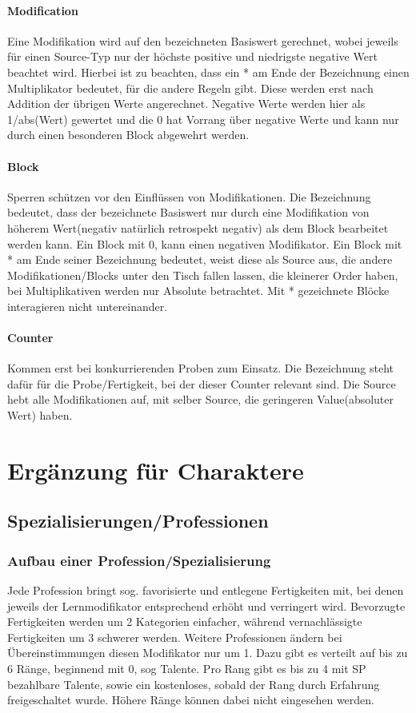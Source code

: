 \documentclass[a4paper,12pt,oneside]{book}
\begin{document}
\subsection{Modification}
Eine Modifikation wird auf den bezeichneten Basiswert gerechnet, wobei jeweils für einen Source-Typ nur der höchste positive und niedrigste negative Wert beachtet wird. Hierbei ist zu beachten, dass ein * am Ende der Bezeichnung einen Multiplikator bedeutet, für die andere Regeln gibt. Diese werden erst nach Addition der übrigen Werte angerechnet. Negative Werte werden hier als 1/abs(Wert) gewertet und die 0 hat Vorrang über negative Werte und kann nur durch einen besonderen Block abgewehrt werden.
\subsection{Block}
Sperren schützen vor den Einflüssen von Modifikationen. Die Bezeichnung bedeutet, dass der bezeichnete Basiswert nur durch eine Modifikation von höherem Wert(negativ natürlich retrospekt negativ) als dem Block bearbeitet werden kann. Ein Block mit 0, kann einen negativen Modifikator. Ein Block mit * am Ende seiner Bezeichnung bedeutet, weist diese als Source aus, die andere Modifikationen/Blocks unter den Tisch fallen lassen, die kleinerer Order haben, bei Multiplikativen werden nur Absolute betrachtet. Mit * gezeichnete Blöcke interagieren nicht untereinander.
\subsection{Counter}
Kommen erst bei konkurrierenden Proben zum Einsatz. Die Bezeichnung steht dafür für die Probe/Fertigkeit, bei der dieser Counter relevant sind. Die Source hebt alle Modifikationen auf, mit selber Source, die geringeren Value(absoluter Wert) haben.

\part{Ergänzung für Charaktere}
\setcounter{chapter}{0}

\chapter{Spezialisierungen/Professionen}
\section{Aufbau einer Profession/Spezialisierung}
Jede Profession bringt sog. favorisierte und entlegene Fertigkeiten mit, bei denen jeweils der Lernmodifikator entsprechend erhöht und verringert wird. Bevorzugte Fertigkeiten werden um 2 Kategorien einfacher, während vernachlässigte Fertigkeiten um 3 schwerer werden. Weitere Professionen ändern bei Übereinstimmungen diesen Modifikator nur um 1.
Dazu gibt es verteilt auf bis zu 6 Ränge, beginnend mit 0, sog Talente.  
Pro Rang gibt es bis zu 4 mit SP bezahlbare Talente, sowie ein kostenloses, sobald der Rang durch Erfahrung freigeschaltet wurde. Höhere Ränge können dabei nicht eingesehen werden.
\end{document}
